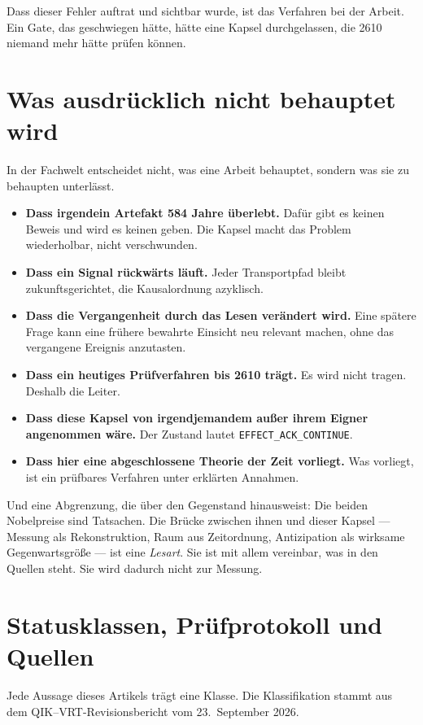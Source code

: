 \documentclass[11pt,a4paper]{article}
\theoremstyle{remark}
\newcommand{\qikvrt}{QIK--VRT}
\begin{document}
Dass dieser Fehler auftrat und sichtbar wurde, ist das Verfahren bei der
Arbeit. Ein Gate, das geschwiegen hätte, hätte eine Kapsel durchgelassen,
die 2610 niemand mehr hätte prüfen können.

\section{Was ausdrücklich nicht behauptet wird}

In der Fachwelt entscheidet nicht, was eine Arbeit behauptet, sondern was
sie zu behaupten unterlässt.

\begin{itemize}
  \item \textbf{Dass irgendein Artefakt 584 Jahre überlebt.} Dafür gibt es
    keinen Beweis und wird es keinen geben. Die Kapsel macht das Problem
    wiederholbar, nicht verschwunden.
  \item \textbf{Dass ein Signal rückwärts läuft.} Jeder Transportpfad bleibt
    zukunftsgerichtet, die Kausalordnung azyklisch.
  \item \textbf{Dass die Vergangenheit durch das Lesen verändert wird.} Eine
    spätere Frage kann eine frühere bewahrte Einsicht neu relevant machen,
    ohne das vergangene Ereignis anzutasten.
  \item \textbf{Dass ein heutiges Prüfverfahren bis 2610 trägt.} Es wird
    nicht tragen. Deshalb die Leiter.
  \item \textbf{Dass diese Kapsel von irgendjemandem außer ihrem Eigner
    angenommen wäre.} Der Zustand lautet \texttt{EFFECT\_ACK\_CONTINUE}.
  \item \textbf{Dass hier eine abgeschlossene Theorie der Zeit vorliegt.}
    Was vorliegt, ist ein prüfbares Verfahren unter erklärten Annahmen.
\end{itemize}

Und eine Abgrenzung, die über den Gegenstand hinausweist: Die beiden
Nobelpreise sind Tatsachen. Die Brücke zwischen ihnen und dieser Kapsel ---
Messung als Rekonstruktion, Raum aus Zeitordnung, Antizipation als wirksame
Gegenwartsgröße --- ist eine \emph{Lesart}. Sie ist mit allem vereinbar, was
in den Quellen steht. Sie wird dadurch nicht zur Messung.

\section{Statusklassen, Prüfprotokoll und Quellen}

Jede Aussage dieses Artikels trägt eine Klasse. Die Klassifikation stammt
aus dem \qikvrt{}-Revisionsbericht vom 23.~September 2026.
\end{document}
